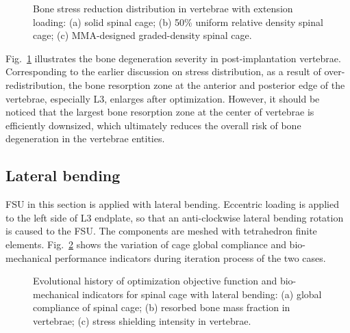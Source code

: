 \documentclass[12pt]{extbook}
\begin{document}
\begin{figure}[htbp]
\centering
{}
\caption{Bone stress reduction distribution in vertebrae with extension loading: (a) solid spinal cage; (b) 50\% uniform relative density spinal cage; (c) MMA-designed graded-density spinal cage.}
\label{mbr_extension}
\end{figure}

Fig.~\ref{mbr_extension} illustrates the bone degeneration severity in post-implantation vertebrae. Corresponding to the earlier discussion on stress distribution, as a result of over-redistribution, the bone resorption zone at the anterior and posterior edge of the vertebrae, especially L3, enlarges after optimization. However, it should be noticed that the largest bone resorption zone at the center of vertebrae is efficiently downsized, which ultimately reduces the overall risk of bone degeneration in the vertebrae entities.\\


\subsection{Lateral bending}

FSU in this section is applied with lateral bending. Eccentric loading is applied to the left side of L3 endplate, so that an anti-clockwise lateral bending rotation is caused to the FSU. The components are meshed with tetrahedron finite elements. Fig.~\ref{history_bending} shows the variation of cage global compliance and bio-mechanical performance indicators during iteration process of the two cases.\\

\begin{figure}[htbp]
\centering
{}
\caption{Evolutional history of optimization objective function and bio-mechanical indicators for spinal cage with lateral bending: (a) global compliance of spinal cage; (b) resorbed bone mass fraction in vertebrae; (c) stress shielding intensity in vertebrae.}
\label{history_bending}
\end{figure}
\end{document}
